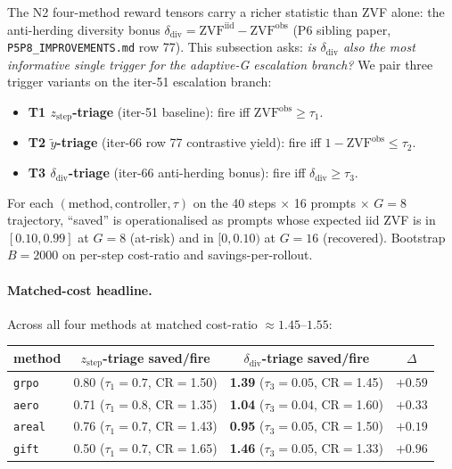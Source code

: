 The N2 four-method reward tensors carry a richer statistic than ZVF alone:
the anti-herding diversity bonus $\delta_{\mathrm{div}} = \mathrm{ZVF}^{\mathrm{iid}}
- \mathrm{ZVF}^{\mathrm{obs}}$ (P6 sibling paper, \texttt{P5P8\_IMPROVEMENTS.md} row 77).
This subsection asks: \emph{is $\delta_{\mathrm{div}}$ also the most informative
single trigger for the adaptive-G escalation branch?} We pair three
trigger variants on the iter-51 escalation branch:
\begin{itemize}
    \item \textbf{T1 $z_{\mathrm{step}}$-triage} (iter-51 baseline):
        fire iff $\mathrm{ZVF}^{\mathrm{obs}} \geq \tau_1$.
    \item \textbf{T2 $\tilde{y}$-triage} (iter-66 row 77 contrastive yield):
        fire iff $1 - \mathrm{ZVF}^{\mathrm{obs}} \leq \tau_2$.
    \item \textbf{T3 $\delta_{\mathrm{div}}$-triage} (iter-66 anti-herding bonus):
        fire iff $\delta_{\mathrm{div}} \geq \tau_3$.
\end{itemize}
For each $(\mathrm{method}, \mathrm{controller}, \tau)$ on the
40 steps $\times$ 16 prompts $\times$ $G{=}8$ trajectory,
``saved'' is operationalised as prompts whose expected iid ZVF is in
$[0.10, 0.99]$ at $G{=}8$ (at-risk) and in $[0, 0.10)$ at $G{=}16$ (recovered).
Bootstrap $B{=}2000$ on per-step cost-ratio and savings-per-rollout.

\paragraph{Matched-cost headline.}
Across all four methods at matched cost-ratio $\approx 1.45$--$1.55$:
\begin{center}
\begin{tabular}{lccc}
\toprule
method & $z_{\mathrm{step}}$-triage saved/fire & $\delta_{\mathrm{div}}$-triage saved/fire & $\Delta$ \\
\midrule
\texttt{grpo}  & 0.80 ($\tau_1{=}0.7$, CR$=$1.50) & \textbf{1.39} ($\tau_3{=}0.05$, CR$=$1.45) & $+0.59$ \\
\texttt{aero}  & 0.71 ($\tau_1{=}0.8$, CR$=$1.35) & \textbf{1.04} ($\tau_3{=}0.04$, CR$=$1.60) & $+0.33$ \\
\texttt{areal} & 0.76 ($\tau_1{=}0.7$, CR$=$1.43) & \textbf{0.95} ($\tau_3{=}0.05$, CR$=$1.50) & $+0.19$ \\
\texttt{gift}  & 0.50 ($\tau_1{=}0.7$, CR$=$1.65) & \textbf{1.46} ($\tau_3{=}0.05$, CR$=$1.33) & $+0.96$ \\
\bottomrule
\end{tabular}
\end{center}

